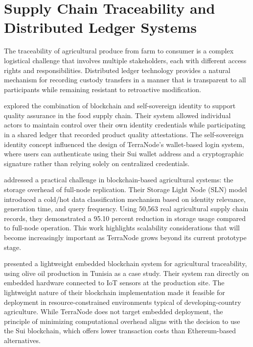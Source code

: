 \section{Supply Chain Traceability and Distributed Ledger Systems}

The traceability of agricultural produce from farm to consumer is a complex logistical challenge that involves multiple stakeholders, each with different access rights and responsibilities. Distributed ledger technology provides a natural mechanism for recording custody transfers in a manner that is transparent to all participants while remaining resistant to retroactive modification.

\textcite{cocco2021blockchain} explored the combination of blockchain and self-sovereign identity to support quality assurance in the food supply chain. Their system allowed individual actors to maintain control over their own identity credentials while participating in a shared ledger that recorded product quality attestations. The self-sovereign identity concept influenced the design of TerraNode's wallet-based login system, where users can authenticate using their Sui wallet address and a cryptographic signature rather than relying solely on centralized credentials.

\textcite{sun2025storage} addressed a practical challenge in blockchain-based agricultural systems: the storage overhead of full-node replication. Their Storage Light Node (SLN) model introduced a cold/hot data classification mechanism based on identity relevance, generation time, and query frequency. Using 50,563 real agricultural supply chain records, they demonstrated a 95.10 percent reduction in storage usage compared to full-node operation. This work highlights scalability considerations that will become increasingly important as TerraNode grows beyond its current prototype stage.

\textcite{ktari2022agricultural} presented a lightweight embedded blockchain system for agricultural traceability, using olive oil production in Tunisia as a case study. Their system ran directly on embedded hardware connected to IoT sensors at the production site. The lightweight nature of their blockchain implementation made it feasible for deployment in resource-constrained environments typical of developing-country agriculture. While TerraNode does not target embedded deployment, the principle of minimizing computational overhead aligns with the decision to use the Sui blockchain, which offers lower transaction costs than Ethereum-based alternatives.

